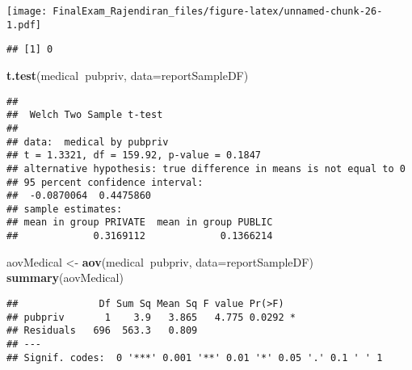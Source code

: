 \documentclass[]{article}
\newenvironment{Shaded}{\begin{snugshade}}{\end{snugshade}}
\newcommand{\DataTypeTok}[1]{\textcolor[rgb]{0.13,0.29,0.53}{#1}}
\newcommand{\KeywordTok}[1]{\textcolor[rgb]{0.13,0.29,0.53}{\textbf{#1}}}
\newcommand{\NormalTok}[1]{#1}
\newcommand{\OperatorTok}[1]{\textcolor[rgb]{0.81,0.36,0.00}{\textbf{#1}}}
\newcommand{\StringTok}[1]{\textcolor[rgb]{0.31,0.60,0.02}{#1}}
\begin{document}
\texttt{[image: FinalExam\_Rajendiran\_files/figure-latex/unnamed-chunk-26-1.pdf]}

\begin{Shaded}
\end{Shaded}

\begin{verbatim}
## [1] 0
\end{verbatim}

\begin{Shaded}
\begin{Highlighting}[]
\KeywordTok{t.test}\NormalTok{(medical}\OperatorTok{~}\NormalTok{pubpriv, }\DataTypeTok{data=}\NormalTok{reportSampleDF)}
\end{Highlighting}
\end{Shaded}

\begin{verbatim}
## 
##  Welch Two Sample t-test
## 
## data:  medical by pubpriv
## t = 1.3321, df = 159.92, p-value = 0.1847
## alternative hypothesis: true difference in means is not equal to 0
## 95 percent confidence interval:
##  -0.0870064  0.4475860
## sample estimates:
## mean in group PRIVATE  mean in group PUBLIC 
##             0.3169112             0.1366214
\end{verbatim}

\begin{Shaded}
\begin{Highlighting}[]
\NormalTok{aovMedical <-}\StringTok{ }\KeywordTok{aov}\NormalTok{(medical}\OperatorTok{~}\NormalTok{pubpriv, }\DataTypeTok{data=}\NormalTok{reportSampleDF)}
\KeywordTok{summary}\NormalTok{(aovMedical)}
\end{Highlighting}
\end{Shaded}

\begin{verbatim}
##              Df Sum Sq Mean Sq F value Pr(>F)  
## pubpriv       1    3.9   3.865   4.775 0.0292 *
## Residuals   696  563.3   0.809                 
## ---
## Signif. codes:  0 '***' 0.001 '**' 0.01 '*' 0.05 '.' 0.1 ' ' 1
\end{verbatim}
\end{document}
